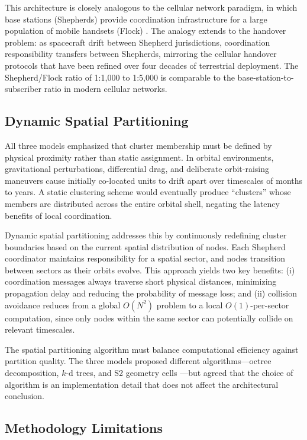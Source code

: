 \documentclass[journal]{IEEEtran}
\begin{document}
This architecture is closely analogous to the cellular network paradigm, in which base stations (Shepherds) provide coordination infrastructure for a large population of mobile handsets (Flock) \cite{rappaport_wireless}. The analogy extends to the handover problem: as spacecraft drift between Shepherd jurisdictions, coordination responsibility transfers between Shepherds, mirroring the cellular handover protocols that have been refined over four decades of terrestrial deployment. The Shepherd/Flock ratio of 1:1{,}000 to 1:5{,}000 is comparable to the base-station-to-subscriber ratio in modern cellular networks.

\subsection{Dynamic Spatial Partitioning}

All three models emphasized that cluster membership must be defined by physical proximity rather than static assignment. In orbital environments, gravitational perturbations, differential drag, and deliberate orbit-raising maneuvers cause initially co-located units to drift apart over timescales of months to years. A static clustering scheme would eventually produce ``clusters'' whose members are distributed across the entire orbital shell, negating the latency benefits of local coordination.

Dynamic spatial partitioning addresses this by continuously redefining cluster boundaries based on the current spatial distribution of nodes. Each Shepherd coordinator maintains responsibility for a spatial sector, and nodes transition between sectors as their orbits evolve. This approach yields two key benefits: (i) coordination messages always traverse short physical distances, minimizing propagation delay and reducing the probability of message loss; and (ii) collision avoidance reduces from a global $O(N^2)$ problem to a local $O(1)$-per-sector computation, since only nodes within the same sector can potentially collide on relevant timescales.

The spatial partitioning algorithm must balance computational efficiency against partition quality. The three models proposed different algorithms---octree decomposition, $k$-d trees, and S2 geometry cells \cite{s2geometry}---but agreed that the choice of algorithm is an implementation detail that does not affect the architectural conclusion.

\subsection{Methodology Limitations}
\end{document}
